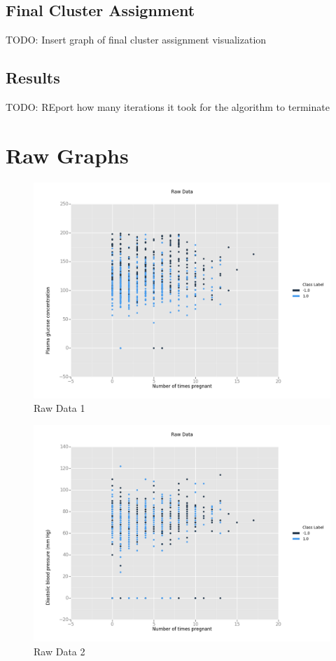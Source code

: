 \documentclass[12pt]{article}
\begin{document}
\subsection*{Final Cluster Assignment}
TODO: Insert graph of final cluster assignment visualization
\subsection*{Results}
TODO: REport how many iterations it took for the algorithm to terminate

\newpage
\section*{Raw Graphs}
\begin{figure}[H]
\begin{center}
\includegraphics[scale=0.66]{raw1.png}
\caption{Raw Data 1}
\label{Raw Data 1}
\end{center}
\end{figure}

\begin{figure}[H]
\begin{center}
\includegraphics[scale=0.66]{raw2.png}
\caption{Raw Data 2}
\label{Raw Data 2}
\end{center}
\end{figure}
\end{document}

